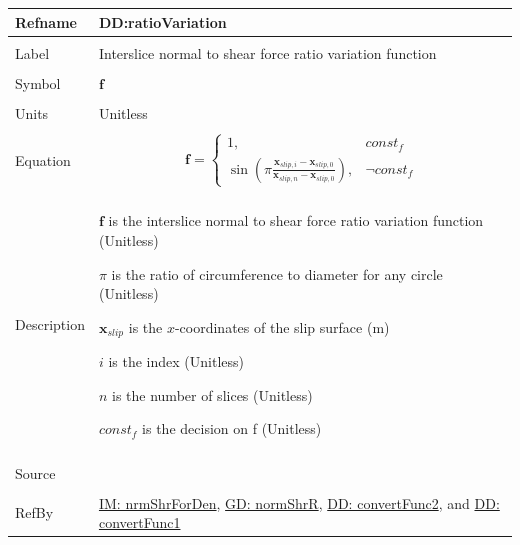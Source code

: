 \documentclass[12pt]{article}
\begin{document}
\vspace{\baselineskip}
\noindent
\begin{minipage}{\textwidth}
\begin{tabular}{>{\raggedright}p{}>{\raggedright\arraybackslash}p{}}
\toprule \textbf{Refname} & \textbf{DD:ratioVariation}
\label{DD:ratioVariation}
\\ \midrule \\
Label & Interslice normal to shear force ratio variation function
        
\\ \midrule \\
Symbol & $\mathbf{f}$
         
\\ \midrule \\
Units & Unitless
        
\\ \midrule \\
Equation & \begin{displaymath}
           \mathbf{f}=\begin{cases}
                      1, & const_f\\
\sin\left(π \frac{{\mathbf{x}_{slip,i}}-{\mathbf{x}_{slip,0}}}{{\mathbf{x}_{slip,n}}-{\mathbf{x}_{slip,0}}}\right), & \neg{}const_f
                      \end{cases}
           \end{displaymath}
\\ \midrule \\
Description & \begin{symbDescription}
              \item{$\mathbf{f}$ is the interslice normal to shear force ratio variation function (Unitless)}
              \item{$π$ is the ratio of circumference to diameter for any circle (Unitless)}
              \item{${\mathbf{x}_{slip}}$ is the $x$-coordinates of the slip surface (m)}
              \item{$i$ is the index (Unitless)}
              \item{$n$ is the number of slices (Unitless)}
              \item{$const_f$ is the decision on f (Unitless)}
              \end{symbDescription}
\\ \midrule \\
Source & \cite{fredlund1977}
         
\\ \midrule \\
RefBy & \hyperref[IM:nrmShrForDen]{IM: nrmShrForDen}, \hyperref[GD:normShrR]{GD: normShrR}, \hyperref[DD:convertFunc2]{DD: convertFunc2}, and \hyperref[DD:convertFunc1]{DD: convertFunc1}
        
\\ \bottomrule
\end{tabular}
\end{minipage}
\end{document}
